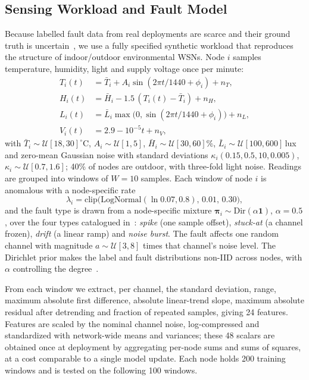 \documentclass[journal,onecolumn,draftclsnofoot,12pt]{IEEEtran}
\begin{document}
\subsection{Sensing Workload and Fault Model}
Because labelled fault data from real deployments are scarce and their ground truth is uncertain~\cite{sharma2010}, we use a fully specified synthetic workload that reproduces the structure of indoor/outdoor environmental WSNs. Node $i$ samples temperature, humidity, light and supply voltage once per minute:
\begin{align}
T_i(t)&=\bar T_i+A_i\sin(2\pi t/1440+\phi_i)+n_T,\nonumber\\
H_i(t)&=\bar H_i-1.5\,(T_i(t)-\bar T_i)+n_H,\\
L_i(t)&=\bar L_i\max\!\big(0,\sin(2\pi t/1440+\phi_i)\big)+n_L,\nonumber\\
V_i(t)&=2.9-10^{-5}t+n_V,\nonumber
\end{align}
with $\bar T_i\sim\mathcal{U}[18,30]^\circ$C, $A_i\sim\mathcal{U}[1,5]$, $\bar H_i\sim\mathcal{U}[30,60]\%$, $\bar L_i\sim\mathcal{U}[100,600]$\,lux and zero-mean Gaussian noise with standard deviations $\kappa_i(0.15,0.5,10,0.005)$, $\kappa_i\sim\mathcal{U}[0.7,1.6]$; 40\% of nodes are outdoor, with three-fold light noise. Readings are grouped into windows of $W=10$ samples. Each window of node $i$ is anomalous with a node-specific rate
\[\lambda_i=\mathrm{clip}\big(\mathrm{LogNormal}(\ln 0.07,0.8),\,0.01,\,0.30\big),\]
and the fault type is drawn from a node-specific mixture $\boldsymbol\pi_i\sim\mathrm{Dir}(\alpha\mathbf{1})$, $\alpha=0.5$, over the four types catalogued in~\cite{ni2009,sharma2010}: \emph{spike} (one sample offset), \emph{stuck-at} (a channel frozen), \emph{drift} (a linear ramp) and \emph{noise burst}. The fault affects one random channel with magnitude $a\sim\mathcal{U}[3,8]$ times that channel's noise level. The Dirichlet prior makes the label and fault distributions non-IID across nodes, with $\alpha$ controlling the degree~\cite{hsu2019}.

From each window we extract, per channel, the standard deviation, range, maximum absolute first difference, absolute linear-trend slope, maximum absolute residual after detrending and fraction of repeated samples, giving 24 features. Features are scaled by the nominal channel noise, log-compressed and standardized with network-wide means and variances; these 48 scalars are obtained once at deployment by aggregating per-node sums and sums of squares, at a cost comparable to a single model update. Each node holds 200 training windows and is tested on the following 100 windows.
\end{document}
